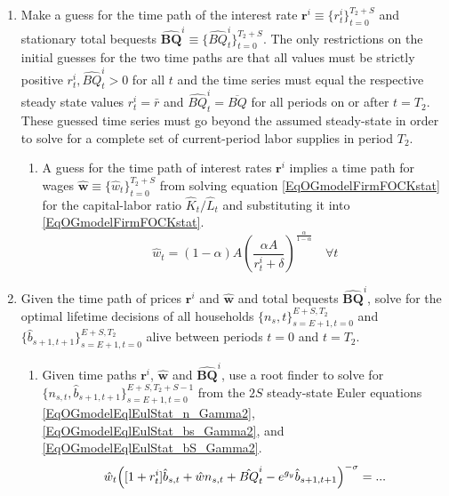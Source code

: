 \documentclass[letterpaper,12pt]{article}
\theoremstyle{definition}
\begin{document}
    \begin{enumerate}
      \item Make a guess for the time path of the interest rate $\bm{r}^i\equiv\{r_t^i\}_{t=0}^{T_2+S}$ and stationary total bequests $\bm{\hat{BQ}}^i\equiv\{\hat{BQ}_t^i\}_{t=0}^{T_2 + S}$. The only restrictions on the initial guesses for the two time paths are that all values must be strictly positive $r_t^i, \hat{BQ}_t^i> 0$ for all $t$ and the time series must equal the respective steady state values $r_t^i=\bar{r}$ and $\hat{BQ}_t^i=\overline{BQ}$ for all periods on or after $t=T_2$. These guessed time series must go beyond the assumed steady-state in order to solve for a complete set of current-period labor supplies in period $T_2$.
      \begin{enumerate}
        \item A guess for the time path of interest rates $\bm{r}^i$ implies a time path for wages $\bm{\hat{w}}\equiv\{\hat{w}_t\}_{t=0}^{T_2+S}$ from solving equation \eqref{EqOGmodelFirmFOCKstat} for the capital-labor ratio $\hat{K}_t/\hat{L}_t$ and substituting it into \eqref{EqOGmodelFirmFOCKstat}.
        \begin{equation}\label{EqOGmodel_wfuncr_TP}
          \hat{w}_t = (1-\alpha)A\left(\frac{\alpha A}{r_t^i + \delta}\right)^{\frac{\alpha}{1-\alpha}} \quad\forall t
        \end{equation}
      \end{enumerate}
      \item Given the time path of prices $\bm{r}^i$ and $\bm{\hat{w}}$ and total bequests $\bm{\hat{BQ}}^i$, solve for the optimal lifetime decisions of all households $\{n_s,t\}_{s=E+1,t=0}^{E+S,T_2}$ and $\{\hat{b}_{s+1,t+1}\}_{s=E+1,t=0}^{E+S,T_2}$ alive between periods $t=0$ and $t=T_2$.
      \begin{enumerate}
        \item Given time paths $\bm{r}^i$, $\bm{\hat{w}}$ and $\bm{\hat{BQ}}^i$, use a root finder to solve for $\{n_{s,t}, \hat{b}_{s+1,t+1}\}_{s=E+1,t=0}^{E+S,T_2+S-1}$ from the $2S$ steady-state Euler equations \eqref{EqOGmodelEqlEulStat_n_Gamma2}, \eqref{EqOGmodelEqlEulStat_bs_Gamma2}, and \eqref{EqOGmodelEqlEulStat_bS_Gamma2}.
        \begin{equation}\label{EqOGmodelEqlEulStat_n_Gamma2}
          \begin{split}
            &\hat{w}_t\Bigl([1 + r_t^i]\hat{b}_{s,t} + \hat{w}n_{s,t} + \hat{BQ}_t^i - e^{g_y}\hat{b}_{s+1,t+1}\Bigr)^{-\sigma} = ...  \\

\end{split}
\end{equation}
\end{enumerate}
\end{enumerate}
\end{document}
